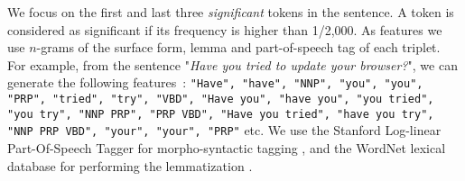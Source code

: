 We focus on the first and last three \textit{significant} tokens in the sentence. %
A token is considered as significant if its frequency is higher than  1/2,000.
As features we use $n$-grams of the surface form, lemma and part-of-speech tag of each triplet. For example, from the sentence "\textit{Have you tried to update your browser?}", we can generate the following features~: \texttt{\footnotesize "Have", "have", "NNP", "you", "you", "PRP", "tried", "try", "VBD", "Have you", "have you", "you tried", "you try", "NNP PRP", "PRP VBD", "Have you tried", "have you try", "NNP PRP VBD", "your", "your", "PRP"} etc.
%
%
We use the Stanford Log-linear Part-Of-Speech Tagger for morpho-syntactic tagging \cite{toutanova2003feature}, and the WordNet lexical database for performing the lemmatization \cite{miller1995wordnet}.


